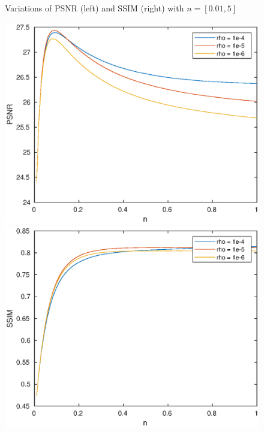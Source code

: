 \documentclass[12pt,a4paper]{article}
\begin{document}
\begin{enumerate}
\begin{figure}[h]
\begin{minipage}[t]{.5\textwidth}
        \end{minipage}
        \caption{Variations of PSNR (left) and SSIM (right) with $n= [0.01,5]$}
        \label{fig:test1}
    \end{figure}
    \begin{figure}[h]
        \begin{minipage}[t]{.5\textwidth}
          \centerline{\includegraphics[scale=0.5]{times_serie_psnr2.eps}}
        \end{minipage}
       \begin{minipage}[t]{.5\textwidth}
          \centerline{\includegraphics[scale=0.5]{times_serie_ssim2.eps}}

\end{minipage}
\end{figure}
\end{enumerate}
\end{document}
